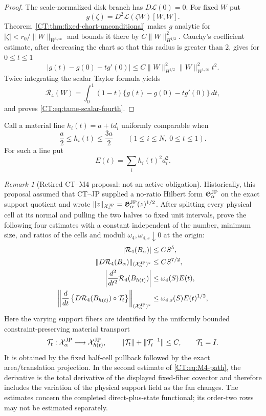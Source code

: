 \documentclass[11pt]{amsart}
\numberwithin{equation}{section}
\theoremstyle{definition}
\theoremstyle{remark}
\newtheorem{remark}[theorem]{Remark}
\newcommand{\Gjp}{\mathfrak G^{\rm JP}}
\newcommand{\Xjp}{\mathcal X^{\rm JP}}
\begin{document}
\begin{proof}
The scale-normalized disk branch has $D\mathcal L(0)=0$.  For fixed $W$ put
\[
 g(\zeta)=D^2\mathcal L(\zeta W)[W,W].
\]
Theorem~\ref{CT:thm:fixed-chart-unconditional} makes $g$ analytic for
$|\zeta|<r_0/\|W\|_{W^{1,\infty}}$ and bounds it there by
$C\|W\|_{H^{1/2}}^2$.  Cauchy's coefficient estimate, after decreasing the
chart so that this radius is greater than $2$, gives for $0\le t\le1$
\[
 |g(t)-g(0)-tg'(0)|
 \le C\|W\|_{H^{1/2}}^2\|W\|_{W^{1,\infty}}^2t^2.
\]
Twice integrating the scalar Taylor formula yields
\[
 \mathcal R_4(W)
 =\int_0^1(1-t)\{g(t)-g(0)-tg'(0)\}\,dt,
\]
and proves \eqref{CT:eq:tame-scalar-fourth}.
\end{proof}

Call a material line $h_i(t)=a+td_i$ uniformly comparable when
\begin{equation}\label{CT:eq:uniformly-comparable}
 \frac a2\le h_i(t)\le\frac{3a}{2}
 \qquad(1\le i\le N,\ 0\le t\le1).
\end{equation}
For such a line put
\[
 E(t)=\sum_i h_i(t)^2d_i^2.
\]

\begin{remark}[Retired CT--M4 proposal: not an active obligation]
\label{CT:obl:material-fourth}
Historically, this proposal assumed that CT--JP supplied a no-ratio Hilbert
form $\Gjp_\alpha$ on the exact support quotient and wrote
$\|z\|_{\Xjp_\alpha}=\Gjp_\alpha(z)^{1/2}$.  After splitting every physical
cell at its normal and pulling the two halves to fixed unit intervals,
prove the following four estimates with a constant independent of the
number, minimum size, and ratios of the cells and moduli
$\omega_4,\omega_{4,s}\downarrow0$ at the origin:
\begin{align}
 |\mathcal R_4(B_\alpha)|&\le CS^5,\notag\\
 \|D\mathcal R_4(B_\alpha)\|_{(\Xjp_\alpha)^*}&\le CS^{7/2},
 \label{CT:eq:M4-size}\\
 \left|\frac{d^2}{dt^2}\mathcal R_4(B_{h(t)})\right|
 &\le \omega_4(S) E(t),\notag\\
 \left\|\frac d{dt}\left\{D\mathcal R_4(B_{h(t)})
     \circ\mathcal T_t\right\}\right\|_{(\Xjp_\alpha)^*}
 &\le \omega_{4,s}(S)E(t)^{1/2},
 \label{CT:eq:M4-path}
\end{align}
Here the varying support fibers are identified by the uniformly bounded
constraint-preserving material transport
\[
 \mathcal T_t:\Xjp_\alpha\longrightarrow\Xjp_{h(t)},
 \qquad
 \|\mathcal T_t\|+\|\mathcal T_t^{-1}\|\le C,
 \qquad \mathcal T_1=I.
\]
It is obtained by the fixed half-cell pullback followed by the exact
area/translation projection.  In the second estimate of
\eqref{CT:eq:M4-path}, the derivative is the total derivative of the displayed
fixed-fiber covector and therefore includes the variation of the physical
support field as the fan changes.  The estimates concern the completed direct-plus-state
functional; its order-two rows may not be estimated separately.
\end{remark}
\end{document}
